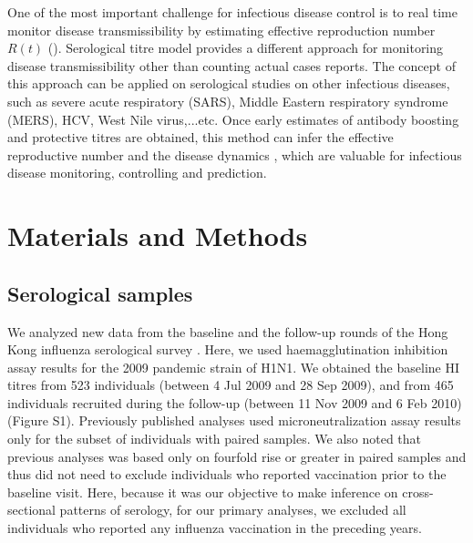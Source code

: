 \documentclass{article}
\begin{document}
One of the most important challenge for infectious disease control is to real time monitor disease transmissibility by estimating effective reproduction number $R(t)$ (\cite{Cowling2010}). Serological titre model provides a different approach for monitoring disease transmissibility other than counting actual cases reports. The concept of this approach can be applied on serological studies on other infectious diseases, such as severe acute respiratory (SARS), Middle Eastern respiratory syndrome (MERS), HCV, West Nile virus,...etc. Once early estimates of antibody boosting and protective titres are obtained, this method can infer the effective reproductive number and the disease dynamics , which are valuable for infectious disease monitoring, controlling and prediction.

\section{Materials and Methods}

\subsection{Serological samples}
We analyzed new data from the baseline and the follow-up rounds of the Hong Kong influenza serological survey \cite{Riley2011}. Here, we used haemagglutination inhibition assay results for the 2009 pandemic strain of H1N1. We obtained the baseline HI titres from 523 individuals (between 4 Jul 2009 and 28 Sep 2009), and from 465 individuals recruited during the follow-up (between 11 Nov 2009 and 6 Feb 2010) (Figure S1). Previously published analyses used microneutralization assay results only for the subset of individuals with paired samples. We also noted that previous analyses was based only on fourfold rise or greater in paired samples and thus did not need to exclude individuals who reported vaccination prior to the baseline visit. Here, because it was our objective to make inference on cross-sectional patterns of serology, for our primary analyses, we excluded all individuals who reported any influenza vaccination in the preceding years.
\end{document}
